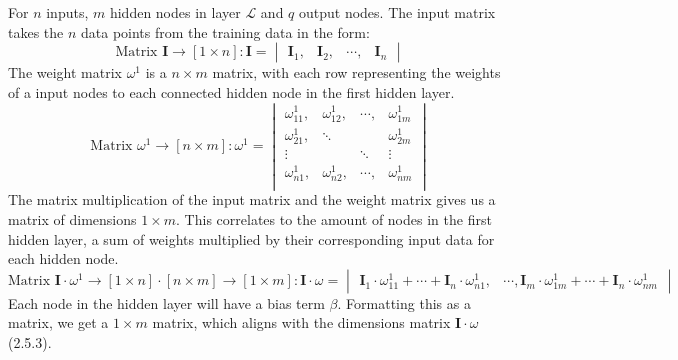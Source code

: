 \documentclass{report}
\begin{document}
For $n$ inputs, $m$ hidden nodes in layer $\mathcal{L}$ and $q$ output nodes.
\vspace{1em}
\newline
The input matrix takes the $n$ data points from the training data in the form:
\begin{equation}
    \text{Matrix }\mathbf{I}\rightarrow \left[1\times n\right] : \mathbf{I} = 
        \begin{vmatrix}
        \mathbf{I}_1 ,& \mathbf{I}_2 ,&\cdots, & \mathbf{I}_n
        \end{vmatrix}
\end{equation}
\newline
The weight matrix $\omega^1$ is a $n\times m$ matrix, with each row representing the weights of a input nodes to each connected hidden node in the first hidden layer.
\begin{equation}
    \text{Matrix }\omega^{1}\rightarrow \left[n\times m\right] : \omega^1 = 
        \begin{vmatrix}
        \omega_{11}^{1} ,& \omega_{12}^{1} ,&\cdots, & \omega_{1m}^{1} \\
        \omega_{21}^{1} ,& \ddots & & \omega_{2m}^{1} \\
        \vdots  & &\ddots & \vdots  \\
        \omega_{n1}^{1} ,& \omega_{n2}^{1} ,&\cdots, & \omega_{nm}^{1} \\
        \end{vmatrix}
\end{equation}
\newline
The matrix multiplication of the input matrix and the weight matrix gives us a matrix of dimensions $1\times m$.
This correlates to the amount of nodes in the first hidden layer, a sum of weights multiplied by their corresponding input data for each hidden node.
\begin{equation}
    \text{Matrix }\mathbf{I}\cdot\omega^{1}\rightarrow \left[1\times n\right]\cdot\left[n\times m\right]\rightarrow \left[1\times m\right]: \mathbf{I}\cdot\omega =
        \begin{vmatrix}
        \mathbf{I}_1\cdot\omega_{11}^{1} + \cdots +  \mathbf{I}_n\cdot\omega_{n1}^{1} ,& \cdots, \mathbf{I}_m\cdot\omega_{1m}^{1} + \cdots +  \mathbf{I}_n\cdot\omega_{nm}^{1}
        \end{vmatrix}
\end{equation}
\newline
Each node in the hidden layer will have a bias term $\beta$.
Formatting this as a matrix, we get a $1\times m$ matrix, which aligns with the dimensions matrix $\mathbf{I}\cdot\omega$ (2.5.3).
\end{document}
